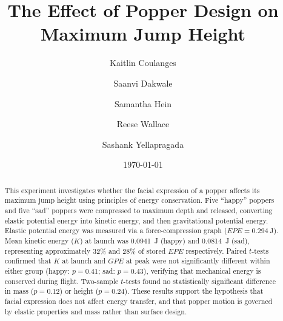 \documentclass[amsmath,amssymb,aps,endfloats,linenumbers]{revtex4-2}
\begin{document}
\title{The Effect of Popper Design on Maximum Jump Height}
\author{Kaitlin Coulanges}
\author{Saanvi Dakwale}
\author{Samantha Hein}
\author{Reese Wallace}
\author{Sashank Yellapragada}

\date{\today}

\begin{abstract}
This experiment investigates whether the facial expression of a popper affects its maximum jump height using principles of energy conservation. Five ``happy'' poppers and five ``sad'' poppers were compressed to maximum depth and released, converting elastic potential energy into kinetic energy, and then gravitational potential energy. Elastic potential energy was measured via a force-compression graph ($EPE = \qty{0.294}{\joule}$). Mean kinetic energy ($K$) at launch was \qty{0.0941}{\joule} (happy) and \qty{0.0814}{\joule} (sad), representing approximately \num{32}\% and \num{28}\% of stored $EPE$ respectively. Paired $t$-tests confirmed that $K$ at launch and $GPE$ at peak were not significantly different within either group (happy: $p = 0.41$; sad: $p = 0.43$), verifying that mechanical energy is conserved during flight. Two-sample $t$-tests found no statistically significant difference in mass ($p = 0.12$) or height ($p = 0.24$). These results support the hypothesis that facial expression does not affect energy transfer, and that popper motion is governed by elastic properties and mass rather than surface design.
\end{abstract}


\maketitle\thispagestyle{mytitlepage}
\end{document}
